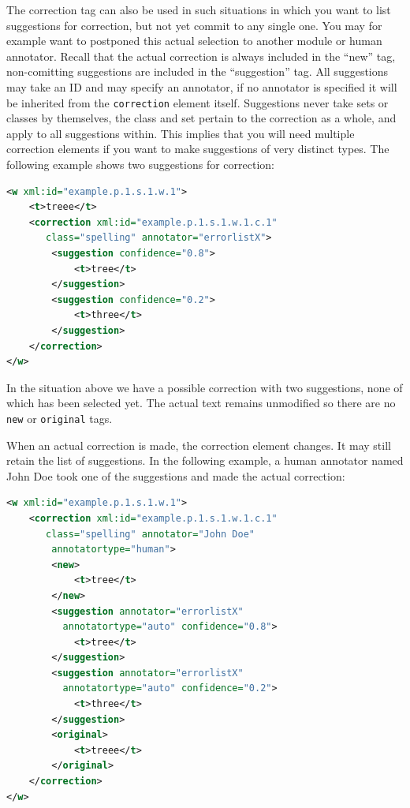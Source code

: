 \documentclass[a4paper,12pt]{report}
\begin{document}
The correction tag can also be used in such situations in which you want to list suggestions for correction, but not yet commit to any single one. You may for example want to postponed this actual selection to another module or human annotator. Recall that the actual correction is always included in the ``new'' tag, non-comitting suggestions are included in the ``suggestion'' tag. All suggestions may take an ID and may specify an annotator, if no annotator is specified it will be inherited from the \texttt{correction} element itself. Suggestions never take sets or classes by themselves, the class and set pertain to the correction as a whole, and apply to all suggestions within. This implies that you will need multiple correction elements if you want to make suggestions of very distinct types. The following example shows two suggestions for correction:
 
\begin{lstlisting}[language=xml]
<w xml:id="example.p.1.s.1.w.1">
    <t>treee</t>
    <correction xml:id="example.p.1.s.1.w.1.c.1"
       class="spelling" annotator="errorlistX">
        <suggestion confidence="0.8">
            <t>tree</t>
        </suggestion>
        <suggestion confidence="0.2">
            <t>three</t>
        </suggestion>
    </correction>
</w>    
\end{lstlisting}

In the situation above we have a possible correction with two suggestions, none of which has been selected yet. The actual text remains unmodified so there are no \texttt{new} or \texttt{original} tags.

When an actual correction is made, the correction element changes. It may still retain the list of suggestions. In the following example, a human annotator named John Doe took one of the suggestions and made the actual correction:

\begin{lstlisting}[language=xml]
<w xml:id="example.p.1.s.1.w.1">
    <correction xml:id="example.p.1.s.1.w.1.c.1"
       class="spelling" annotator="John Doe"
        annotatortype="human">
        <new>
            <t>tree</t>
        </new>
        <suggestion annotator="errorlistX" 
          annotatortype="auto" confidence="0.8">
            <t>tree</t>
        </suggestion>
        <suggestion annotator="errorlistX" 
          annotatortype="auto" confidence="0.2">
            <t>three</t>
        </suggestion>
        <original>
            <t>treee</t>
        </original>
    </correction>
</w>    
\end{lstlisting}
\end{document}
